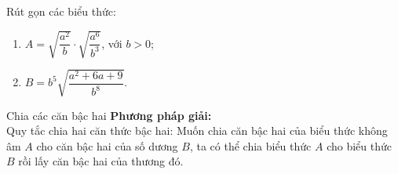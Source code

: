 \begin{vd}
	Rút gọn các biểu thức:
	\begin{multicols}{2}
    \begin{enumerate}
    \item $ A=\sqrt{\dfrac{a^2}{b}}\cdot \sqrt{\dfrac{a^6}{b^3}} $, với $ b>0 $;
    \item $ B=b^5\sqrt{\dfrac{a^2+6a+9}{b^8}}. $
    \end{enumerate}
	\end{multicols}
\end{vd}

\begin{dang}{Chia các căn bậc hai}
    \textbf{Phương pháp giải:} \\
    Quy tắc chia hai căn thức bậc hai: Muốn chia căn bậc hai của biểu thức không âm $ A $ cho căn bậc hai của số dương $ B $, ta có thể chia biểu thức $ A $ cho biểu thức $ B $ rồi lấy căn bậc hai của thương đó.
\end{dang}

